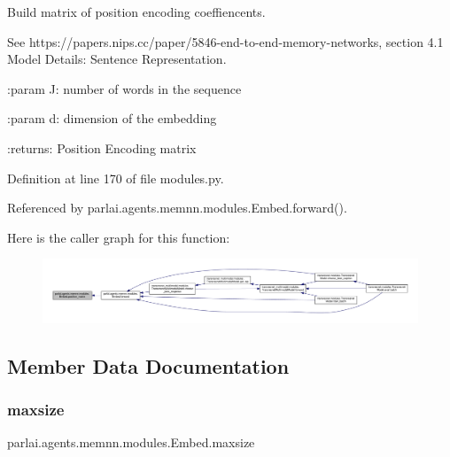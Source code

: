 \begin{DoxyVerb}Build matrix of position encoding coeffiencents.

See https://papers.nips.cc/paper/5846-end-to-end-memory-networks,
section 4.1 Model Details: Sentence Representation.

:param J:
    number of words in the sequence

:param d:
    dimension of the embedding

:returns:
    Position Encoding matrix
\end{DoxyVerb}
 

Definition at line 170 of file modules.\+py.



Referenced by parlai.\+agents.\+memnn.\+modules.\+Embed.\+forward().

Here is the caller graph for this function\+:
\nopagebreak
\begin{figure}[H]
\begin{center}
\leavevmode
\includegraphics[width=350pt]{classparlai_1_1agents_1_1memnn_1_1modules_1_1Embed_aa6a44a42ac7d06f0f0598b7291d1dc58_icgraph}
\end{center}
\end{figure}


\subsection{Member Data Documentation}
\mbox{\label{classparlai_1_1agents_1_1memnn_1_1modules_1_1Embed_aa77cd4b6d146e1981b96b911e6eb62c1}} 
\subsubsection{\texorpdfstring{maxsize}{maxsize}}
{\footnotesize\ttfamily parlai.\+agents.\+memnn.\+modules.\+Embed.\+maxsize\hspace{0.3cm}{\ttfamily [static]}}



